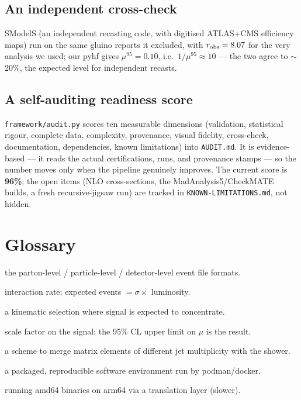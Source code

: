 \documentclass[11pt,oneside]{report}
\newcommand{\code}[1]{\texttt{#1}}
\begin{document}
\section{An independent cross-check}
SModelS (an independent recasting code, with digitised ATLAS+CMS efficiency maps) run on the same
gluino reports it excluded, with $r_{\rm obs}=8.07$ for the very analysis we used; our pyhf gives
$\mu^{95}=0.10$, i.e.\ $1/\mu^{95}\approx10$ --- the two agree to $\sim$20\%, the expected level for
independent recasts.

\section{A self-auditing readiness score}
\code{framework/audit.py} scores ten measurable dimensions (validation, statistical rigour, complete
data, complexity, provenance, visual fidelity, cross-check, documentation, dependencies, known
limitations) into \code{AUDIT.md}. It is evidence-based --- it reads the actual certifications, runs,
and provenance stamps --- so the number moves only when the pipeline genuinely improves. The current
score is \textbf{96\%}; the open items (NLO cross-sections, the MadAnalysis5/CheckMATE builds, a fresh
recursive-jigsaw run) are tracked in \code{KNOWN-LIMITATIONS.md}, not hidden.

\appendix
\chapter{Glossary}
\begin{description}[style=nextline,leftmargin=0pt,font=\bfseries\ttfamily]
  \item[LHE / HepMC / ROOT] the parton-level / particle-level / detector-level event file formats.
  \item[cross-section $\sigma$] interaction rate; expected events $=\sigma\times$ luminosity.
  \item[signal region] a kinematic selection where signal is expected to concentrate.
  \item[signal strength $\mu$] scale factor on the signal; the 95\% CL upper limit on $\mu$ is the result.
  \item[CKKW-L] a scheme to merge matrix elements of different jet multiplicity with the shower.
  \item[container / image] a packaged, reproducible software environment run by podman/docker.
  \item[emulation] running amd64 binaries on arm64 via a translation layer (slower).
\end{description}
\end{document}
